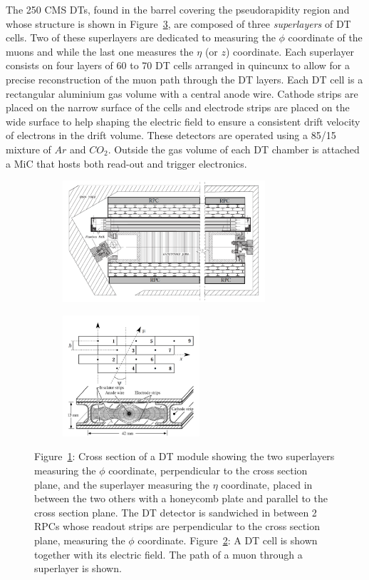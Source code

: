 	The 250 CMS DTs, found in the barrel covering the pseudorapidity region  and whose structure is shown in Figure~\ref{fig:DT}, are composed of three \textit{superlayers} of DT cells. Two of these superlayers are dedicated to measuring the $\phi$ coordinate of the muons and while the last one measures the $\eta$ (or $z$) coordinate. Each superlayer consists on four layers of 60 to 70 DT cells arranged in quincunx to allow for a precise reconstruction of the muon path through the DT layers. Each DT cell is a rectangular aluminium gas volume with a central anode wire. Cathode strips are placed on the narrow surface of the cells and electrode strips are placed on the wide surface to help shaping the electric field to ensure a consistent drift velocity of electrons in the drift volume. These detectors are operated using a 85/15 mixture of $Ar$ and $CO_2$. Outside the gas volume of each DT chamber is attached a \acf{MiC} that hosts both read-out and trigger electronics.
	
	\begin{figure}[H]
		\begin{subfigure}{0.6\linewidth}
			\centering
			\includegraphics[height = 4.5cm]{fig/chapt3/DT_layout.png}
			\caption{\label{fig:DT:A}}
		\end{subfigure}
		\begin{subfigure}{0.4\linewidth}
			\centering
			\includegraphics[height = 4.5cm]{fig/chapt3/DT_cells.png}
			\caption{\label{fig:DT:B}}
		\end{subfigure}
		\caption{\label{fig:DT} Figure~\ref{fig:DT:A}: Cross section of a DT module showing the two superlayers measuring the $\phi$ coordinate, perpendicular to the cross section plane, and the superlayer measuring the $\eta$ coordinate, placed in between the two others with a honeycomb plate and parallel to the cross section plane. The DT detector is sandwiched in between 2 RPCs whose readout strips are perpendicular to the cross section plane, measuring the $\phi$ coordinate. Figure~\ref{fig:DT:B}: A DT cell is shown together with its electric field. The path of a muon through a superlayer is shown.}
	\end{figure}
	
